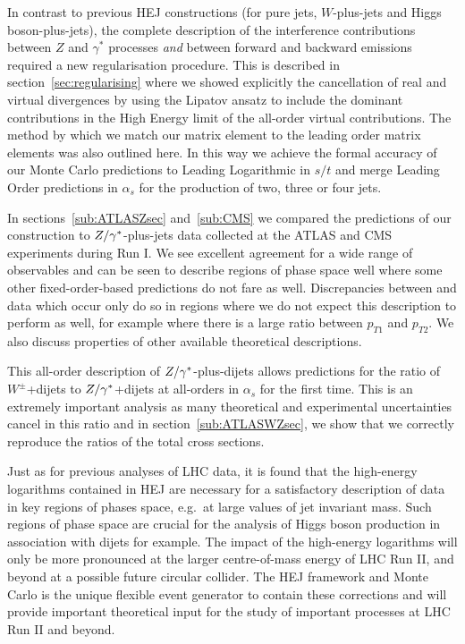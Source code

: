 	In contrast to previous HEJ constructions (for pure jets, $W$-plus-jets and
	Higgs boson-plus-jets), the complete description of the interference
	contributions between $Z$ and $\gamma^*$ processes \emph{and} between forward
	and backward emissions required a new regularisation procedure.  This is
	described in section~\ref{sec:regularising} where we showed explicitly the
	cancellation of real and virtual divergences by using the Lipatov ansatz to
	include the dominant contributions in the High Energy limit of the all-order
	virtual contributions.  The method by which we match our matrix element to the
	leading order matrix elements was also outlined here. In this way we
	achieve the formal accuracy of our Monte Carlo predictions to Leading
	Logarithmic in $s/t$ and merge Leading Order predictions in $\alpha_s$ for the
	production of two, three or four jets.

	In sections~\ref{sub:ATLASZsec} and~\ref{sub:CMS} we compared the predictions of our
	construction to $Z/\gamma^*$-plus-jets data collected at the ATLAS and CMS experiments
	during Run I.  We see excellent agreement for a wide range of observables and
	can be seen to describe regions of phase space well where some other
	fixed-order-based predictions do not fare as well.  Discrepancies between \HEJ and data which occur
	only do so in regions where we do not expect this description to perform as
	well, for example where there is a large ratio between $p_{T1}$ and $p_{T2}$.
	We also discuss properties of other available theoretical descriptions.

	This all-order description of $Z/\gamma^*$-plus-dijets allows predictions for the ratio
	of $W^\pm$+dijets to $Z/\gamma^*$+dijets at all-orders in $\alpha_s$ for the first
	time.  This is an extremely important analysis as many theoretical and
	experimental uncertainties cancel in this ratio and in section~\ref{sub:ATLASWZsec},
	we show that we correctly reproduce the ratios of the total cross sections.

	Just as for previous analyses of LHC data, it is found that the high-energy logarithms
	contained in HEJ are necessary for a satisfactory description of data in key regions of phases
	space, e.g.~at large values of jet invariant mass. Such regions of phase
	space are crucial for the analysis of Higgs boson production in association
	with dijets for example. The impact of the high-energy
	logarithms will only be more pronounced at the larger centre-of-mass energy of
	LHC Run II, and beyond at a possible future circular collider.  The HEJ
	framework and Monte
	Carlo is the unique flexible event generator to contain these corrections and
	will provide important theoretical input for the study of important processes
	at LHC Run II and beyond.

